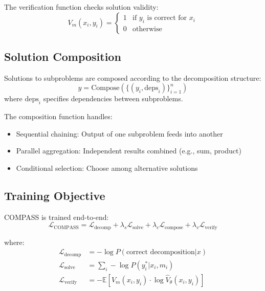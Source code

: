 \documentclass[11pt,a4paper]{article}
\newcommand{\E}{\mathbb{E}}
\begin{document}
The verification function checks solution validity:
\begin{equation}
    V_m(x_i, y_i) = \begin{cases}
        1 & \text{if } y_i \text{ is correct for } x_i \\
        0 & \text{otherwise}
    \end{cases}
\end{equation}

\subsection{Solution Composition}

Solutions to subproblems are composed according to the decomposition structure:
\begin{equation}
    y = \text{Compose}(\{(y_i, \text{deps}_i)\}_{i=1}^n)
\end{equation}
where $\text{deps}_i$ specifies dependencies between subproblems.

The composition function handles:
\begin{itemize}
    \item Sequential chaining: Output of one subproblem feeds into another
    \item Parallel aggregation: Independent results combined (e.g., sum, product)
    \item Conditional selection: Choose among alternative solutions
\end{itemize}

\subsection{Training Objective}

COMPASS is trained end-to-end:
\begin{equation}
    \mathcal{L}_{\text{COMPASS}} = \mathcal{L}_{\text{decomp}} + \lambda_s \mathcal{L}_{\text{solve}} + \lambda_c \mathcal{L}_{\text{compose}} + \lambda_v \mathcal{L}_{\text{verify}}
\end{equation}

where:
\begin{align}
    \mathcal{L}_{\text{decomp}} &= -\log P(\text{correct decomposition}|x) \\
    \mathcal{L}_{\text{solve}} &= \sum_i -\log P(y_i^*|x_i, m_i) \\
    \mathcal{L}_{\text{verify}} &= -\E\left[V_m(x_i, y_i) \cdot \log \hat{V}_\theta(x_i, y_i)\right]
\end{align}
\end{document}
